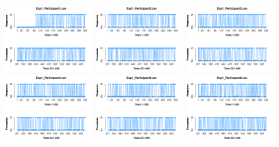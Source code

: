 \begin{itemize}
\begin{figure}[th]
\centering
\includegraphics[width=0.30\textwidth]{Figures/Response_Exp1_P1} \includegraphics[width=0.30\textwidth]{Figures/Response_Exp1_P2} \includegraphics[width=0.30\textwidth]{Figures/Response_Exp1_P3}
\includegraphics[width=0.30\textwidth]{Figures/Response_Exp1_P4} \includegraphics[width=0.30\textwidth]{Figures/Response_Exp1_P5} \includegraphics[width=0.30\textwidth]{Figures/Response_Exp1_P6}

\end{figure}
\end{itemize}
